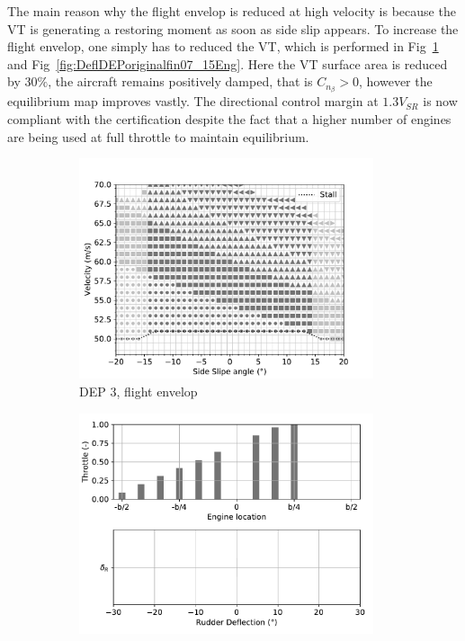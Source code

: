 The main reason why the flight envelop is reduced at high velocity is because the VT is generating a restoring moment as soon as side slip appears. To increase the flight envelop, one simply has to reduced the VT, which is performed in Fig~\ref{fig:DEPoriginalfin07_15engine} and Fig~\ref{fig:DeflDEPoriginalfin07_15Eng}. Here the VT surface area is reduced by $30\%$, the aircraft remains positively damped, that is $C_{n_\beta}>0$, however the equilibrium map improves vastly. The directional control margin at $1.3V_{SR}$ is now compliant with the certification despite the fact that a higher number of engines are being used at full throttle to maintain equilibrium.


\begin{figure}[hbt!]
	\centering
	\begin{subfigure}{0.49\textwidth}
		\includegraphics[width=0.95\textwidth]{DEPoriginalMapBetaVelfin07Eng15RudTrue}
		\caption{DEP 3, flight envelop}
		\label{fig:DEPoriginalfin07_15engine}
	\end{subfigure}
	\begin{subfigure}{0.49\textwidth}
		\includegraphics[width=0.95\textwidth]{DeflDEPoriginalfin07Eng15RudTrue}

\end{subfigure}
\end{figure}

